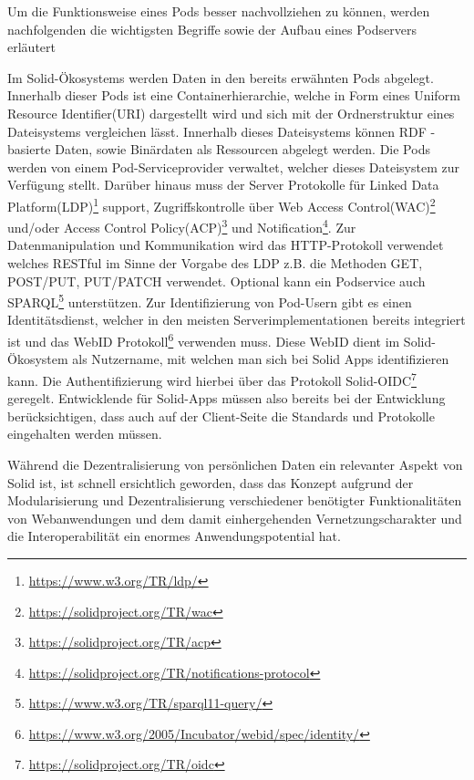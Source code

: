 \documentclass[acmtog]{acmart}
\begin{document}
Um die Funktionsweise eines Pods besser nachvollziehen zu können, werden nachfolgenden die wichtigsten Begriffe sowie der Aufbau eines Podservers erläutert

Im Solid-Ökosystems werden Daten in den bereits erwähnten Pods abgelegt. Innerhalb dieser Pods ist eine Containerhierarchie, welche in Form eines Uniform Resource Identifier(URI) dargestellt wird und sich mit der Ordnerstruktur eines Dateisystems vergleichen lässt. Innerhalb dieses Dateisystems können RDF - basierte Daten, sowie Binärdaten als Ressourcen abgelegt werden. Die Pods werden von einem Pod-Serviceprovider verwaltet, welcher dieses Dateisystem zur Verfügung stellt. Darüber hinaus muss der Server Protokolle für Linked Data Platform(LDP)\footnote{\url{https://www.w3.org/TR/ldp/}} support, Zugriffskontrolle über Web Access Control(WAC)\footnote{\url{https://solidproject.org/TR/wac}} und/oder Access Control Policy(ACP)\footnote{\url{https://solidproject.org/TR/acp}} und Notification\footnote{\url{https://solidproject.org/TR/notifications-protocol}}. Zur Datenmanipulation und Kommunikation wird das HTTP-Protokoll verwendet welches RESTful im Sinne der Vorgabe des LDP z.B. die Methoden GET, POST/PUT, PUT/PATCH verwendet. Optional kann ein Podservice auch SPARQL\footnote{\url{https://www.w3.org/TR/sparql11-query/}} unterstützen.
Zur Identifizierung von Pod-Usern gibt es einen Identitätsdienst, welcher in den meisten Serverimplementationen bereits integriert ist und das WebID Protokoll\footnote{\url{https://www.w3.org/2005/Incubator/webid/spec/identity/}} verwenden muss. Diese WebID dient im Solid-Ökosystem als Nutzername, mit welchen man sich bei Solid Apps identifizieren kann. Die Authentifizierung wird hierbei über das Protokoll Solid-OIDC\footnote{\url{https://solidproject.org/TR/oidc}} geregelt.
Entwicklende für Solid-Apps müssen also bereits bei der Entwicklung berücksichtigen, dass auch auf der Client-Seite die Standards und Protokolle eingehalten werden müssen.~\cite{sambra2016solid}

Während die Dezentralisierung von persönlichen Daten ein relevanter Aspekt von Solid ist, ist schnell ersichtlich geworden, dass das Konzept aufgrund der Modularisierung und Dezentralisierung verschiedener benötigter Funktionalitäten von Webanwendungen und dem damit einhergehenden Vernetzungscharakter und die Interoperabilität ein enormes Anwendungspotential hat.

\label{section:problemeUndGefahrenDesAktuellenZentralisiertenKonzepts}
\end{document}
